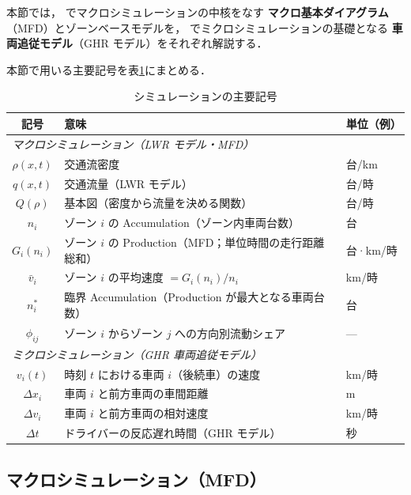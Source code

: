本節では， でマクロシミュレーションの中核をなす
\textbf{マクロ基本ダイアグラム}（MFD）とゾーンベースモデルを，
 でミクロシミュレーションの基礎となる
\textbf{車両追従モデル}（GHR モデル）をそれぞれ解説する．

本節で用いる主要記号を表\ref{tab:ch9-notation}にまとめる．

\begin{table}[hbtp]
  \centering
  \caption{シミュレーションの主要記号}
  \label{tab:ch9-notation}
  \begin{tabular}{cll}
    \toprule
    記号 & 意味 & 単位（例） \\
    \midrule
    \multicolumn{3}{l}{\textit{マクロシミュレーション（LWR モデル・MFD）}} \\
    \midrule
    $\rho(x,t)$      & 交通流密度 & 台/km \\
    $q(x,t)$         & 交通流量（LWR モデル） & 台/時 \\
    $Q(\rho)$        & 基本図（密度から流量を決める関数） & 台/時 \\
    $n_i$            & ゾーン $i$ の Accumulation（ゾーン内車両台数） & 台 \\
    $G_i(n_i)$       & ゾーン $i$ の Production（MFD；単位時間の走行距離総和） & 台·km/時 \\
    $\bar{v}_i$      & ゾーン $i$ の平均速度 $= G_i(n_i)/n_i$ & km/時 \\
    $n_i^*$          & 臨界 Accumulation（Production が最大となる車両台数） & 台 \\
    $\phi_{ij}$      & ゾーン $i$ からゾーン $j$ への方向別流動シェア & — \\
    \midrule
    \multicolumn{3}{l}{\textit{ミクロシミュレーション（GHR 車両追従モデル）}} \\
    \midrule
    $v_i(t)$         & 時刻 $t$ における車両 $i$（後続車）の速度 & km/時 \\
    $\Delta x_i$     & 車両 $i$ と前方車両の車間距離 & m \\
    $\Delta v_i$     & 車両 $i$ と前方車両の相対速度 & km/時 \\
    $\Delta t$       & ドライバーの反応遅れ時間（GHR モデル） & 秒 \\
    \bottomrule
  \end{tabular}
\end{table}

\subsection{マクロシミュレーション（MFD）}
\label{subsec:mfd}


